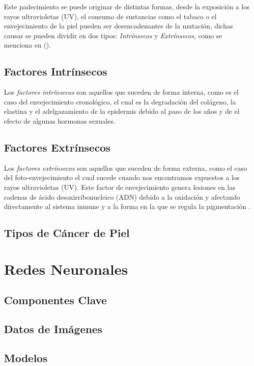 Este padecimiento se puede originar de distintas formas, desde la exposición a los rayos ultravioletas (UV), el consumo de sustancias como el tabaco o el envejecimiento de la piel pueden ser desencadenantes de la mutación, dichas causas se pueden dividir en dos tipos: \emph{Intrínsecos} y \emph{Extrínsecos}, como se menciona en \citeauthor{skin_1} (\citeyear{skin_1}).

\subsection{Factores Intrínsecos}
Los \emph{factores intrínsecos} son aquellos que suceden de forma interna, como es el caso del envejecimiento cronológico, el cual es la degradación del colágeno, la elastina y el adelgazamiento de la epidermis debido al paso de los años y de el efecto de algunas hormonas sexuales.

\subsection{Factores Extrínsecos}
Los \emph{factores extrínsecos} son aquellos que suceden de forma externa, como el caso del foto-envejecimiento el cual sucede cuando nos encontramos expuestos a los rayos ultravioletas (UV). Este factor de envejecimiento genera lesiones en las cadenas de ácido desoxirribonucleico (ADN) debido a la oxidación y afectando directamente al sistema inmune y a la forma en la que se regula la pigmentación \citep{skin_aging}.

\subsection{Tipos de Cáncer de Piel}

\section{Redes Neuronales}

\subsection{Componentes Clave}
\subsection{Datos de Imágenes}
\subsection{Modelos}
